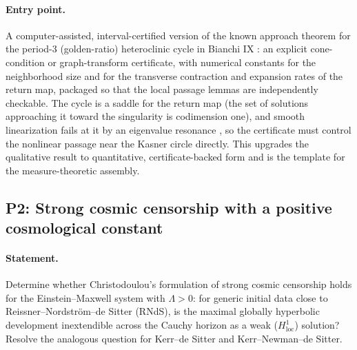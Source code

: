 \documentclass[11pt,letterpaper]{article}
\begin{document}
\paragraph{Entry point.} A computer-assisted, interval-certified version of the known approach theorem for the period-3 (golden-ratio) heteroclinic cycle in Bianchi IX \cite{liebscher2011}: an explicit cone-condition or graph-transform certificate, with numerical constants for the neighborhood size and for the transverse contraction and expansion rates of the return map, packaged so that the local passage lemmas are independently checkable. The cycle is a saddle for the return map (the set of solutions approaching it toward the singularity is codimension one), and smooth linearization fails at it by an eigenvalue resonance \cite{buchner2025}, so the certificate must control the nonlinear passage near the Kasner circle directly. This upgrades the qualitative result to quantitative, certificate-backed form and is the template for the measure-theoretic assembly.

\subsection{P2: Strong cosmic censorship with a positive cosmological constant}
\label{sec:p2}

\paragraph{Statement.} Determine whether Christodoulou's formulation of strong cosmic censorship holds for the Einstein--Maxwell system with $\Lambda>0$: for generic initial data close to Reissner--Nordstr\"om--de Sitter (RNdS), is the maximal globally hyperbolic development inextendible across the Cauchy horizon as a weak ($H^1_{\mathrm{loc}}$) solution? Resolve the analogous question for Kerr--de Sitter and Kerr--Newman--de Sitter.
\end{document}
